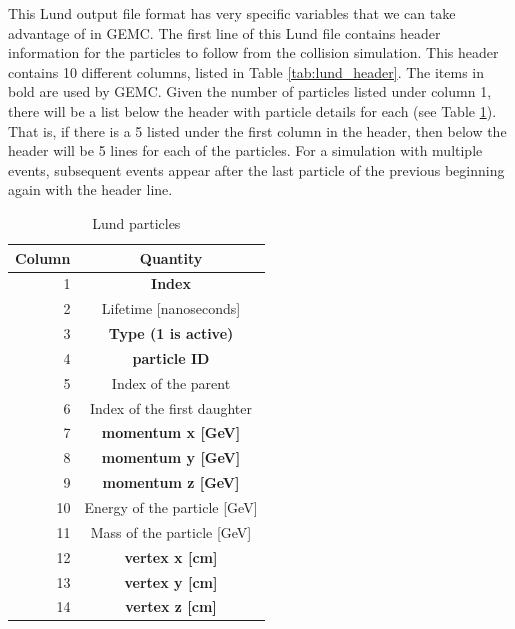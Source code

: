 This Lund output file format has very specific variables that we can take advantage of in GEMC. The first line of this Lund file contains header information for the particles to follow from the collision simulation. This header contains 10 different columns, listed in Table \ref{tab:lund_header}. The items in bold are used by GEMC. Given the number of particles listed under column 1, there will be a list below the header with particle details for each (see Table \ref{tab:lund_particles}). That is, if there is a 5 listed under the first column in the header, then below the header will be 5 lines for each of the particles. For a simulation with multiple events, subsequent events appear after the last particle of the previous beginning again with the header line.

\begin{table}[h!]
	\begin{center}
		\caption{Lund particles}
		\label{tab:lund_particles}
		\begin{tabular}{r|c} %
			\rowcolor{cyan} \textbf{Column} & \textbf{Quantity} \\
			\hline
			1 & \textbf{Index} \\
			\rowcolor{lightgray} 2 & Lifetime [nanoseconds] \\
			3 & \textbf{Type (1 is active)} \\
			\rowcolor{lightgray} 4 & \textbf{particle ID} \\
			5 & Index of the parent \\
			\rowcolor{lightgray} 6 & Index of the first daughter \\
			7 & \textbf{momentum x [GeV]} \\
			\rowcolor{lightgray} 8 & \textbf{momentum y [GeV]} \\
			9 & \textbf{momentum z [GeV]} \\
			\rowcolor{lightgray} 10 & Energy of the particle [GeV] \\
			11 & Mass of the particle [GeV] \\
			\rowcolor{lightgray} 12 & \textbf{vertex x [cm]} \\
			13 & \textbf{vertex y [cm]} \\
			\rowcolor{lightgray} 14 & \textbf{vertex z [cm]} \\
			\hline
		\end{tabular}
	\end{center}
\end{table}

